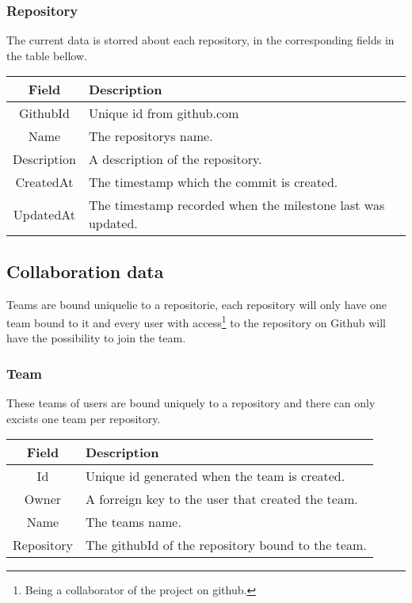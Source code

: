 \subsubsection*{Repository}
The current data is storred about each repository, in the corresponding fields in the table bellow. \\

\vspace{0.5cm}
\begin{tabularx}{\linewidth}{| c | X |}
    \hline
    \rowcolor[gray]{0.8}
    \textbf{Field} & \textbf{Description} \\
    \hline
    GithubId & Unique id from github.com\\ \hline
    Name & The repositorys name.\\ \hline
   	Description & A description of the repository.\\ \hline
    CreatedAt & The timestamp which the commit is created.\\ \hline
    UpdatedAt & The timestamp recorded when the milestone last was updated.\\ 
    \hline
\end{tabularx}
\vspace{0.5cm}

\subsection{Collaboration data}
Teams are bound uniquelie to a repositorie, each repository will only have one team bound to it and every user with access\footnote{Being a collaborator of the project on github.} to the repository on Github will have the possibility to join the team.  


\subsubsection*{Team}
These teams of users are bound uniquely to a repository and there can only excists one team per repository. \\

\vspace{0.5cm}
\begin{tabularx}{\linewidth}{| c | X |}
    \hline
    \rowcolor[gray]{0.8}
    \textbf{Field} & \textbf{Description} \\
    \hline
    Id & Unique id generated when the team is created.\\ \hline
   	Owner & A forreign key to the user that created the team.\\ \hline
   	Name & The teams name.\\ \hline
    Repository & The githubId of the repository bound to the team.\\ 
    \hline
\end{tabularx}
\vspace{0.5cm}

